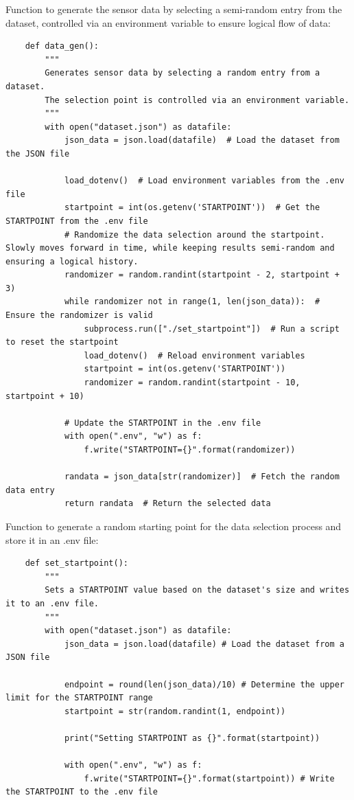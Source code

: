 Function to generate the sensor data by selecting a semi-random entry from the dataset, controlled via an environment variable to ensure logical flow of data:
\begin{verbatim}
    def data_gen():
        """
        Generates sensor data by selecting a random entry from a dataset.
        The selection point is controlled via an environment variable.
        """
        with open("dataset.json") as datafile:
            json_data = json.load(datafile)  # Load the dataset from the JSON file
        
            load_dotenv()  # Load environment variables from the .env file
            startpoint = int(os.getenv('STARTPOINT'))  # Get the STARTPOINT from the .env file
            # Randomize the data selection around the startpoint. Slowly moves forward in time, while keeping results semi-random and ensuring a logical history.
            randomizer = random.randint(startpoint - 2, startpoint + 3)
            while randomizer not in range(1, len(json_data)):  # Ensure the randomizer is valid
                subprocess.run(["./set_startpoint"])  # Run a script to reset the startpoint
                load_dotenv()  # Reload environment variables
                startpoint = int(os.getenv('STARTPOINT'))
                randomizer = random.randint(startpoint - 10, startpoint + 10)

            # Update the STARTPOINT in the .env file
            with open(".env", "w") as f:
                f.write("STARTPOINT={}".format(randomizer))

            randata = json_data[str(randomizer)]  # Fetch the random data entry
            return randata  # Return the selected data
\end{verbatim}

Function to generate a random starting point for the data selection process and store it in an .env file:
\begin{verbatim}
    def set_startpoint():
        """
        Sets a STARTPOINT value based on the dataset's size and writes it to an .env file.
        """
        with open("dataset.json") as datafile:
            json_data = json.load(datafile) # Load the dataset from a JSON file
            
            endpoint = round(len(json_data)/10) # Determine the upper limit for the STARTPOINT range
            startpoint = str(random.randint(1, endpoint))

            print("Setting STARTPOINT as {}".format(startpoint))

            with open(".env", "w") as f:
                f.write("STARTPOINT={}".format(startpoint)) # Write the STARTPOINT to the .env file
\end{verbatim}

